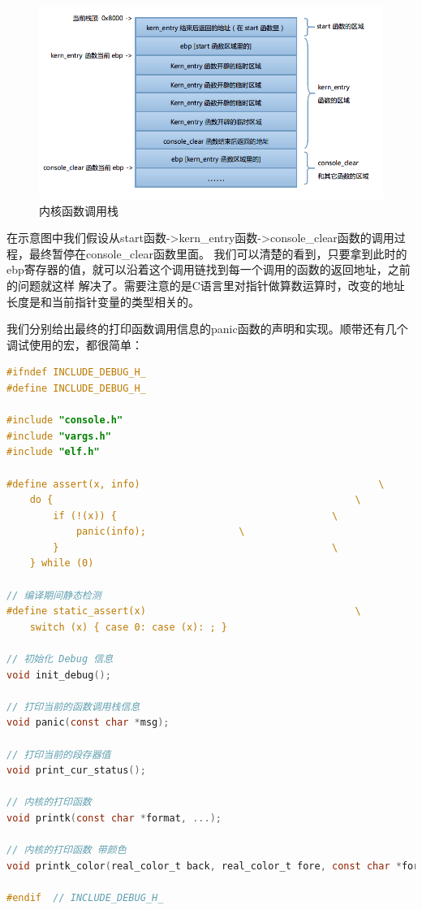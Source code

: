 \begin{figure}[ht]
      \centering
      \includegraphics[scale=0.5]{picture/chapt5/os_function_stack.png}
      \caption{内核函数调用栈}
\end{figure}

\par 在示意图中我们假设从start函数->kern\_entry函数->console\_clear函数的调用过程，最终暂停在console\_clear函数里面。\allowbreak
我们可以清楚的看到，只要拿到此时的ebp寄存器的值，就可以沿着这个调用链找到每一个调用的函数的返回地址，之前的问题就这样\allowbreak
解决了。需要注意的是C语言里对指针做算数运算时，改变的地址长度是和当前指针变量的类型相关的。

\par 我们分别给出最终的打印函数调用信息的panic函数的声明和实现。顺带还有几个调试使用的宏，都很简单：

\begin{lstlisting}[language = C, caption = debug/debug.h]
#ifndef INCLUDE_DEBUG_H_
#define INCLUDE_DEBUG_H_

#include "console.h"
#include "vargs.h"
#include "elf.h"

#define assert(x, info)                                       	\
	do {                                                	\
		if (!(x)) {                                     \
			panic(info);     			\
		}                                               \
	} while (0)
	
// 编译期间静态检测
#define static_assert(x)                                	\
	switch (x) { case 0: case (x): ; }

// 初始化 Debug 信息
void init_debug();

// 打印当前的函数调用栈信息
void panic(const char *msg);

// 打印当前的段存器值
void print_cur_status();

// 内核的打印函数
void printk(const char *format, ...);

// 内核的打印函数 带颜色
void printk_color(real_color_t back, real_color_t fore, const char *format, ...);

#endif 	// INCLUDE_DEBUG_H_
\end{lstlisting}

